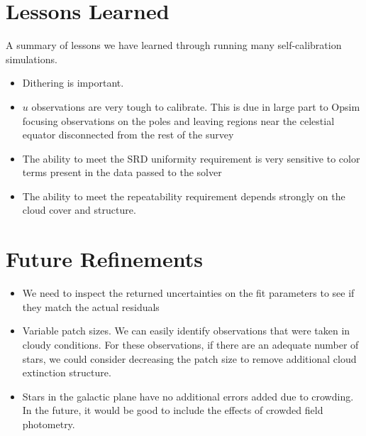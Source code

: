 \documentclass[12pt,preprint]{aastex}
\begin{document}
\section{Lessons Learned}
A summary of lessons we have learned through running many self-calibration simulations.
\begin{itemize}
\item{Dithering is important.  }
\item{$u$ observations are very tough to calibrate.  This is due in large part to Opsim focusing observations on the poles and leaving regions near the celestial equator disconnected from the rest of the survey}
\item{The ability to meet the SRD uniformity requirement is very sensitive to color terms present in the data passed to the solver}
\item{The ability to meet the repeatability requirement depends strongly on the cloud cover and structure.  }
\end{itemize}


\section{Future Refinements}
\begin{itemize}
\item{We need to inspect the returned uncertainties on the fit parameters to see if they match the actual residuals}
\item{Variable patch sizes.  We can easily identify observations that were taken in cloudy conditions.  For these observations, if there are an adequate number of stars, we could consider decreasing the patch size to remove additional cloud extinction structure.}
\item{Stars in the galactic plane have no additional errors added due to crowding.  In the future, it would be good to include the effects of crowded field photometry.  }
\end{itemize}



\end{document}
